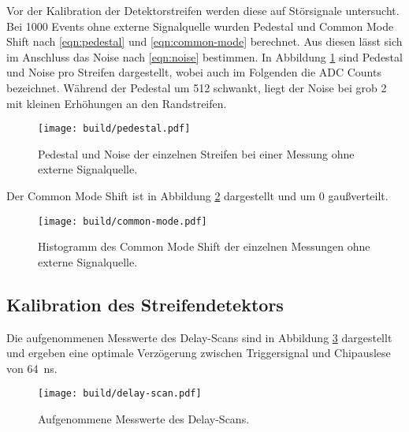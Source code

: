 Vor der Kalibration der Detektorstreifen werden diese auf Störsignale untersucht.
Bei \num{1000} Events ohne externe Signalquelle wurden Pedestal und Common Mode Shift
nach \eqref{eqn:pedestal} und \eqref{eqn:common-mode} berechnet.
Aus diesen lässt sich im Anschluss das Noise nach \eqref{eqn:noise} bestimmen.
In Abbildung \ref{fig:pedestal} sind Pedestal und Noise pro Streifen dargestellt,
wobei auch im Folgenden \si{\adc} die ADC Counts bezeichnet.
Während der Pedestal um \SI{512}{\adc} schwankt, liegt der Noise bei grob
\SI{2}{\adc} mit kleinen Erhöhungen an den Randstreifen.
\begin{figure}
  \centering
  \texttt{[image: build/pedestal.pdf]}  %
  \caption{Pedestal und Noise der einzelnen Streifen bei einer Messung ohne externe
  Signalquelle.}
  \label{fig:pedestal}
\end{figure}
Der Common Mode Shift ist in Abbildung \ref{fig:common-mode} dargestellt und
um \SI{0}{\adc} gaußverteilt.
\begin{figure}
  \centering
  \texttt{[image: build/common-mode.pdf]}  %
  \caption{Histogramm des Common Mode Shift der einzelnen Messungen ohne externe
  Signalquelle.}
  \label{fig:common-mode}
\end{figure}

\FloatBarrier
\subsection{Kalibration des Streifendetektors}
\label{sec:Kalibration-Auswertung}

Die aufgenommenen Messwerte des Delay-Scans sind in Abbildung \ref{fig:delay-scan}
dargestellt und ergeben eine optimale Verzögerung zwischen Triggersignal und
Chipauslese von \SI{64}{\nano\second}.
\begin{figure}
  \centering
  \texttt{[image: build/delay-scan.pdf]}  %
  \caption{Aufgenommene Messwerte des Delay-Scans.}
  \label{fig:delay-scan}
\end{figure}


